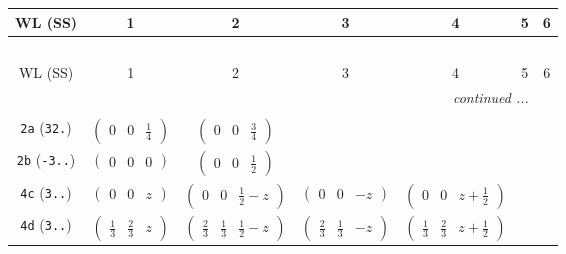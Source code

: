 \documentclass[fleqn,9pt,landscape]{jsarticle}
\begin{document}
\begin{center}
\renewcommand{\arraystretch}{1.2}
\begin{longtable}{ccccccc}
 \hline \hline
WL (SS) & 1 & 2 & 3 & 4 & 5 & 6 \\ \hline \endfirsthead

\multicolumn{6}{l}{\tablename\ \thetable{}} \\
 \hline \hline
WL (SS) & 1 & 2 & 3 & 4 & 5 & 6 \\ \hline \endhead

 \hline \hline
\multicolumn{6}{r}{\footnotesize\it continued ...} \\ \endfoot

 \hline \hline
\multicolumn{6}{r}{} \\ \endlastfoot

{\tt 2a} ({\tt 32.}) & $ \begin{pmatrix} 0 & 0 & \frac{1}{4} \end{pmatrix} $ & $ \begin{pmatrix} 0 & 0 & \frac{3}{4} \end{pmatrix} $ & $  $ & $  $ & $  $ & $  $ \\ \hline
{\tt 2b} ({\tt -3..}) & $ \begin{pmatrix} 0 & 0 & 0 \end{pmatrix} $ & $ \begin{pmatrix} 0 & 0 & \frac{1}{2} \end{pmatrix} $ & $  $ & $  $ & $  $ & $  $ \\ \hline
{\tt 4c} ({\tt 3..}) & $ \begin{pmatrix} 0 & 0 & z \end{pmatrix} $ & $ \begin{pmatrix} 0 & 0 & \frac{1}{2} - z \end{pmatrix} $ & $ \begin{pmatrix} 0 & 0 & - z \end{pmatrix} $ & $ \begin{pmatrix} 0 & 0 & z + \frac{1}{2} \end{pmatrix} $ & $  $ & $  $ \\ \hline
{\tt 4d} ({\tt 3..}) & $ \begin{pmatrix} \frac{1}{3} & \frac{2}{3} & z \end{pmatrix} $ & $ \begin{pmatrix} \frac{2}{3} & \frac{1}{3} & \frac{1}{2} - z \end{pmatrix} $ & $ \begin{pmatrix} \frac{2}{3} & \frac{1}{3} & - z \end{pmatrix} $ & $ \begin{pmatrix} \frac{1}{3} & \frac{2}{3} & z + \frac{1}{2} \end{pmatrix} $ & $  $ & $  $ \\ \hline

\end{longtable}
\end{center}
\end{document}
